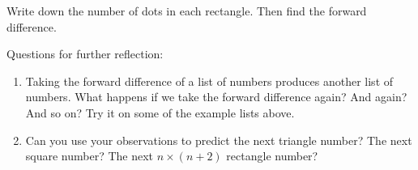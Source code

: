 \documentclass{article}
\begin{document}
\newpage
Write down the number of dots in each rectangle.  Then find the forward difference.

\begin{center}
\end{center}

\newpage
Questions for further reflection:
\begin{enumerate}
\item Taking the forward difference of a list of numbers produces
  another list of numbers.  What happens if we take the forward
  difference again?  And again?  And so on?  Try it on some of the
  example lists above.
\item Can you use your observations to predict the next triangle
  number?  The next square number?  The next $n \times (n+2)$
  rectangle number?
\end{enumerate}
\end{document}
